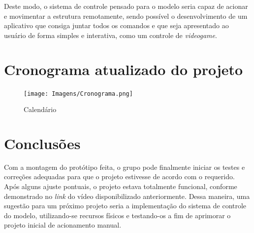 \documentclass[deposito, acronym, symbols]{fei}
\begin{document}
 Deste modo, o sistema de controle pensado para o modelo seria capaz de acionar e movimentar a estrutura remotamente, sendo possível o desenvolvimento de um aplicativo que consiga juntar todos os comandos e que seja apresentado ao usuário de forma simples e interativa, como um controle de \textit{videogame}.

\chapter{Cronograma atualizado do projeto}

 \begin{figure}[!htb]
 \centering
    \caption{Calendário}
    \texttt{[image: Imagens/Cronograma.png]}
    \label{fig:Calendario}
 \end{figure}

\chapter{Conclusões}

Com a montagem do protótipo feita, o grupo pode finalmente iniciar os testes e correções adequadas para que o projeto estivesse de acordo com o requerido. Após alguns ajuste pontuais, o projeto estava totalmente funcional, conforme demonstrado no \textit{link} do vídeo disponibilizado anteriormente. Dessa maneira, uma sugestão para um próximo projeto seria a implementação do sistema de controle do modelo, utilizando-se recursos físicos e testando-os  a fim de aprimorar o projeto inicial de acionamento manual.

\printbibliography
\nocite{*}
\end{document}
